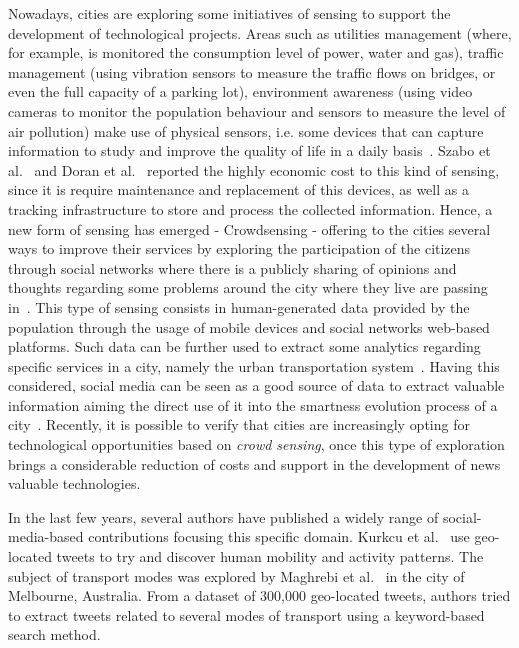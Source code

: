 Nowadays, cities are exploring some initiatives of sensing to support the development of technological projects. Areas such as utilities management (where, for example, is monitored the consumption level of power, water and gas), traffic management (using vibration sensors to measure the traffic flows on bridges, or even the full capacity of a parking lot), environment awareness (using video cameras to monitor the population behaviour and sensors to measure the level of air pollution) make use of physical sensors, i.e. some devices that can capture information to study and improve the quality of life in a daily basis~\cite{kn:Doran2015}. Szabo et al.~\cite{kn:Szabo2013} and Doran et al.~\cite{kn:Doran2015} reported the highly economic cost to this kind of sensing, since it is require maintenance and replacement of this devices, as well as a tracking infrastructure to store and process the collected information. Hence, a new form of sensing has emerged - \gls{Crowdsensing} - offering to the cities several ways to improve their services by exploring the participation of the citizens through social networks where there is a publicly sharing of  opinions and thoughts regarding some problems around the city where they live are passing in~\cite{kn:Roitman2012}. This type of sensing consists in human-generated data provided by the population through the usage of mobile devices and social networks web-based platforms. Such data can be further used to extract some analytics regarding specific services in a city, namely the urban transportation system~\cite{kn:Roitman2012}. Having this considered, social media can be seen as a good source of data to extract valuable information aiming the direct use of it into the smartness evolution process of a city~\cite{kn:Szabo2013}. Recently, it is possible to verify that cities are increasingly opting for technological opportunities based on \textit{crowd sensing}, once this type of exploration brings a considerable reduction of costs and support in the development of news valuable technologies.

In the last few years, several authors have published a widely range of social-media-based contributions focusing this specific domain. Kurkcu et al.~\cite{kurkcu2016evaluating} use geo-located tweets to try and discover human mobility and activity patterns. The subject of transport modes was explored by Maghrebi et al.~\cite{maghrebi2016transportation} in the city of Melbourne, Australia. From a dataset of 300,000 geo-located tweets, authors tried to extract tweets related to several modes of transport using a keyword-based search method. 

